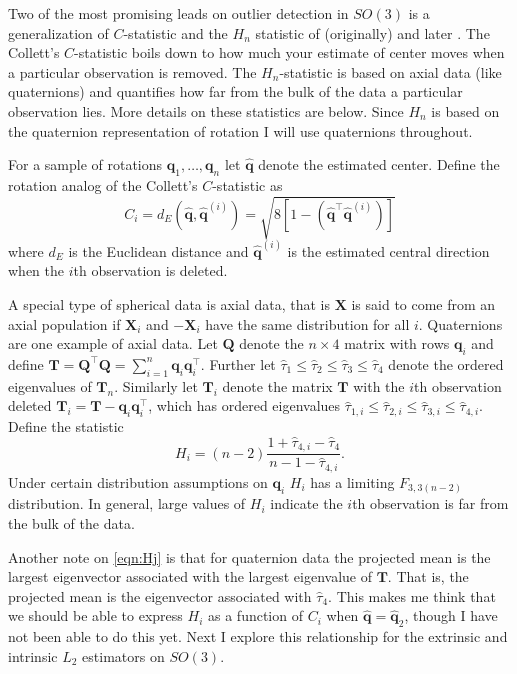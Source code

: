 \documentclass{article}\usepackage[]{graphicx}\usepackage[]{color}
\newcommand{\qest}{{\hat{\bm q}}}
\begin{document}
Two of the most promising leads on outlier detection in $SO(3)$ is a generalization of \cite{collett1980} $C$-statistic and the $H_n$ statistic of (originally) \cite{best1986} and later \cite{figueiredo2005}.  The Collett's $C$-statistic boils down to how much your estimate of center moves when a particular observation is removed.  The $H_n$-statistic is based on axial data (like quaternions) and quantifies how far from the bulk of the data a particular observation lies.  More details on these statistics are below.  Since $H_n$ is based on the quaternion representation of rotation I will use quaternions throughout. 

For a sample of rotations $\bm q_1,\dots,\bm q_n$ let $\qest$ denote the estimated center.  Define the rotation analog of the Collett's $C$-statistic as 
\begin{equation}\label{eqn:Ci}
C_i=d_E(\qest,\hat{\bm q}^{(i)})=\sqrt{8[1-(\qest^\top\qest^{(i)})]}
\end{equation}
where $d_E$ is the Euclidean distance and $\qest^{(i)}$ is the estimated central direction when the $i$th observation is deleted.  

A special type of spherical data is axial data, that is $\bm X$ is said to come from an axial population if $\bm X_i$ and $-\bm X_i$ have the same distribution for all $i$.  Quaternions are one example of axial data.  Let $\bm Q$ denote the $n\times 4$ matrix with rows $\bm q_i$ and define $\bm T=\bm Q^\top\bm Q=\sum_{i=1}^n\bm q_i\bm q_i^\top$.  Further let $\hat\tau_1\leq\hat\tau_2\leq\hat\tau_3\leq\hat\tau_4$ denote the ordered eigenvalues of $\bm T_n$.  Similarly let $\bm T_{i}$ denote the matrix $\bm T$ with the $i$th observation deleted $\bm T_i=\bm T-\bm q_i\bm q_i^\top$, which has ordered eigenvalues $\hat\tau_{1,i}\leq\hat\tau_{2,i}\leq\hat\tau_{3,i}\leq\hat\tau_{4,i}$.  Define the statistic
\begin{equation}\label{eqn:Hj}
H_i=(n-2)\frac{1+\hat\tau_{4,i}-\hat\tau_4}{n-1-\hat\tau_{4,i}}.
\end{equation}
Under certain distribution assumptions on $\bm q_i$  $H_i$ has a limiting $F_{3,3(n-2)}$ distribution.  In general, large values of $H_i$ indicate the $i$th observation is far from the bulk of the data.

Another note on \eqref{eqn:Hj} is that for quaternion data the projected mean is the largest eigenvector associated with the largest eigenvalue of $\bm T$.  That is, the projected mean is the eigenvector associated with $\hat\tau_4$.  This makes me think that we should be able to express $H_i$ as a function of $C_i$ when $\qest=\hat{\bm q}_2$, though I have not been able to do this yet.  Next I explore this relationship for the extrinsic and intrinsic $L_2$ estimators on $SO(3)$. 
\end{document}
